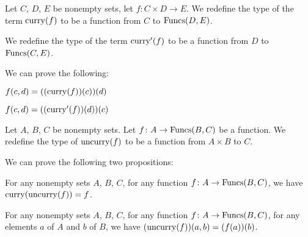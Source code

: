 \documentclass{article}
\begin{document}
\begin{definition}
Let $C$, $D$, $E$ be nonempty sets, let $f\colon C\times D\to E$.
We redefine the type of the term $\operatorname{curry}(f)$ to be a function from $C$
to $\operatorname{Funcs}(D,E)$.

We redefine the type of the term $\operatorname{curry}'(f)$ to be a function from $D$
to $\operatorname{Funcs}(C,E)$.
\end{definition}

We can prove the following:
\begin{thm}
\item\label{funct5:69} $f(c,d)=((\operatorname{curry}(f))(c))(d)$
\item\label{funct5:70} $f(c,d)=((\operatorname{curry}'(f))(d))(c)$
\end{thm}

\begin{definition}
Let $A$, $B$, $C$ be nonempty sets.
Let $f\colon A\to\operatorname{Funcs}(B,C)$ be a function.
We redefine the type of $\operatorname{uncurry}(f)$ to be a function from $A\times B$
to $C$.
\end{definition}

We can prove the following two propositions:
\begin{thm}
\item\label{funct5:71} For any nonempty sets $A$, $B$, $C$, for any
  function $f\colon A\to\operatorname{Funcs}(B,C)$, we have $\operatorname{curry}(\operatorname{uncurry}(f))=f$.
\item\label{funct5:72} For any nonempty sets $A$, $B$, $C$, for any
  function $f\colon A\to\operatorname{Funcs}(B,C)$,
  for any elements $a$ of $A$ and $b$ of $B$,
  we have $(\operatorname{uncurry}(f))(a,b)=(f(a))(b)$.
\end{thm}
\end{document}
